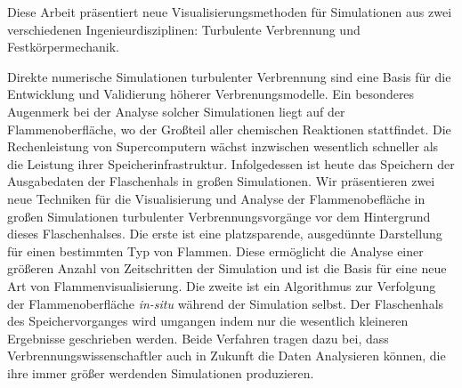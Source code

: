 \documentclass[oneside]{scrartcl}
\author{Timo Oster}
\date{26. April 2019}
\begin{document}
%
Diese Arbeit pr\"asentiert neue Visualisierungsmethoden f\"ur Simulationen aus
zwei verschiedenen Ingenieurdisziplinen: Turbulente Verbrennung und
Festk\"orpermechanik.
%

%
Direkte numerische Simulationen turbulenter Verbrennung sind eine Basis f\"ur
die Entwicklung und Validierung h\"oherer Verbrenungsmodelle.
%
Ein besonderes Augenmerk bei der Analyse solcher Simulationen liegt auf der
Flammenoberfl\"ache, wo der Gro\ss{}teil aller chemischen Reaktionen
stattfindet.
%
Die Rechenleistung von Supercomputern w\"achst inzwischen wesentlich schneller
als die Leistung ihrer Speicherinfrastruktur.
%
Infolgedessen ist heute das Speichern der Ausgabedaten der Flaschenhals in
gro\ss{}en Simulationen.
%
Wir pr\"asentieren zwei neue Techniken f\"ur die Visualisierung und Analyse der
Flammenobefl\"ache in gro\ss{}en Simulationen turbulenter Verbrennungsvorg\"ange
vor dem Hintergrund dieses Flaschenhalses.
%
Die erste ist eine platzsparende, ausged\"unnte Darstellung f\"ur einen
bestimmten Typ von Flammen.
%
Diese erm\"oglicht die Analyse einer gr\"o\ss{}eren Anzahl von Zeitschritten der
Simulation und ist die Basis f\"ur eine neue Art von Flammenvisualisierung.
%
Die zweite ist ein Algorithmus zur Verfolgung der Flammenoberfl\"ache
\emph{in-situ} w\"ahrend der Simulation selbst.
%
Der Flaschenhals des Speichervorganges wird umgangen indem nur die wesentlich
kleineren Ergebnisse geschrieben werden.
%
Beide Verfahren tragen dazu bei, dass Verbrennungswissenschaftler auch in
Zukunft die Daten Analysieren k\"onnen, die ihre immer gr\"o\ss{}er werdenden
Simulationen produzieren.
%
\end{document}
